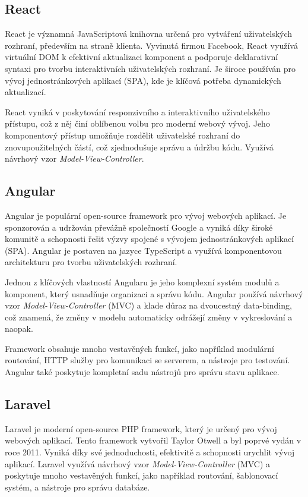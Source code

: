 \subsection{React}
\label{subsec:dev-framework-react}
React je významná JavaScriptová knihovna určená pro vytváření uživatelských rozhraní, především na straně klienta. Vyvinutá firmou Facebook, React využívá virtuální DOM k efektivní aktualizaci komponent a podporuje deklarativní syntaxi pro tvorbu interaktivních uživatelských rozhraní. Je široce používán pro vývoj jednostránkových aplikací (SPA), kde je klíčová potřeba dynamických aktualizací.

React vyniká v poskytování responzivního a interaktivního uživatelského přístupu, což z něj činí oblíbenou volbu pro moderní webový vývoj. Jeho komponentový přístup umožňuje rozdělit uživatelské rozhraní do znovupoužitelných částí, což zjednodušuje správu a údržbu kódu. Využívá návrhový vzor \textit{Model-View-Controller}. \cite{about_react}

\subsection{Angular}
\label{subsec:dev-framework-angular}
Angular je populární open-source framework pro vývoj webových aplikací. Je sponzorován a udržován převážně společností Google a vyniká díky široké komunitě a schopnosti řešit výzvy spojené s vývojem jednostránkových aplikací (SPA). Angular je postaven na jazyce TypeScript a využívá komponentovou architekturu pro tvorbu uživatelských rozhraní.

Jednou z klíčových vlastností Angularu je jeho komplexní systém modulů a komponent, který usnadňuje organizaci a správu kódu. Angular používá návrhový vzor \textit{Model-View-Controller} (MVC) a klade důraz na dvoucestný data-binding, což znamená, že změny v modelu automaticky odrážejí změny v vykreslování a naopak.

Framework obsahuje mnoho vestavěných funkcí, jako například modulární routování, HTTP služby pro komunikaci se serverem, a nástroje pro testování. Angular také poskytuje kompletní sadu nástrojů pro správu stavu aplikace. \cite{about_angular}

\subsection{Laravel}
\label{subsec:dev-framework-laravel}
Laravel je moderní open-source PHP framework, který je určený pro vývoj webových aplikací. Tento framework vytvořil Taylor Otwell a byl poprvé vydán v roce 2011. Vyniká díky své jednoduchosti, efektivitě a schopnosti urychlit vývoj aplikací. Laravel využívá návrhový vzor \textit{Model-View-Controller} (MVC) a poskytuje mnoho vestavěných funkcí, jako například routování, šablonovací systém, a nástroje pro správu databáze.

